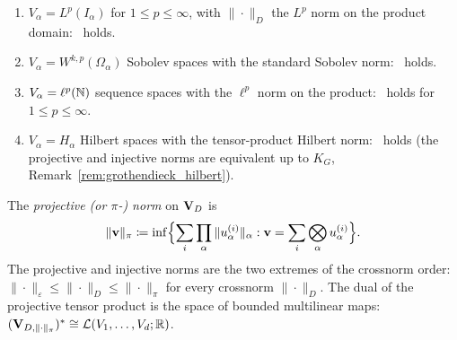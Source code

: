 \begin{proposition}
\label{prop:app:condINJ_examples}
\begin{enumerate}
\item[\textup{(i)}] $V_\alpha = L^p(I_\alpha)$ for $1 \leq p \leq
    \infty$, with $\|\cdot\|_D$ the $L^p$ norm on the product domain:
    \condINJ\ holds.
\item[\textup{(ii)}] $V_\alpha = W^{k,p}(\Omega_\alpha)$ Sobolev spaces
    with the standard Sobolev norm: \condINJ\ holds.
\item[\textup{(iii)}] $V_\alpha = \ell^p(\mathbb{N})$ sequence spaces with the
    $\ell^p$ norm on the product: \condINJ\ holds for $1 \leq p \leq
    \infty$.
\item[\textup{(iv)}] $V_\alpha = H_\alpha$ Hilbert spaces with the
    tensor-product Hilbert norm: \condINJ\ holds (the projective and
    injective norms are equivalent up to $K_G$,
    Remark~\ref{rem:grothendieck_hilbert}).
\end{enumerate}
\end{proposition}

\begin{proposition}
\label{prop:app:projnorm}
The \emph{projective (or $\pi$-) norm} on $\mathbf{V}_D$ is
\begin{equation}
    \|\mathbf{v}\|_\pi \coloneqq
    \inf\Bigl\{
    \sum_i \prod_\alpha \|u_\alpha^{(i)}\|_\alpha :
    \mathbf{v} = \sum_i \bigotimes_\alpha u_\alpha^{(i)}
    \Bigr\}.
\end{equation}
The projective and injective norms are the two extremes of the
crossnorm order: $\|\cdot\|_\varepsilon \leq \|\cdot\|_D \leq
\|\cdot\|_\pi$ for every crossnorm $\|\cdot\|_D$.
The dual of the projective tensor product is the space of bounded
multilinear maps: $(\mathbf{V}_{D,\|\cdot\|_\pi})^* \cong \mathcal{L}(V_1, \ldots, V_d; \mathbb{R})$.
\end{proposition}
